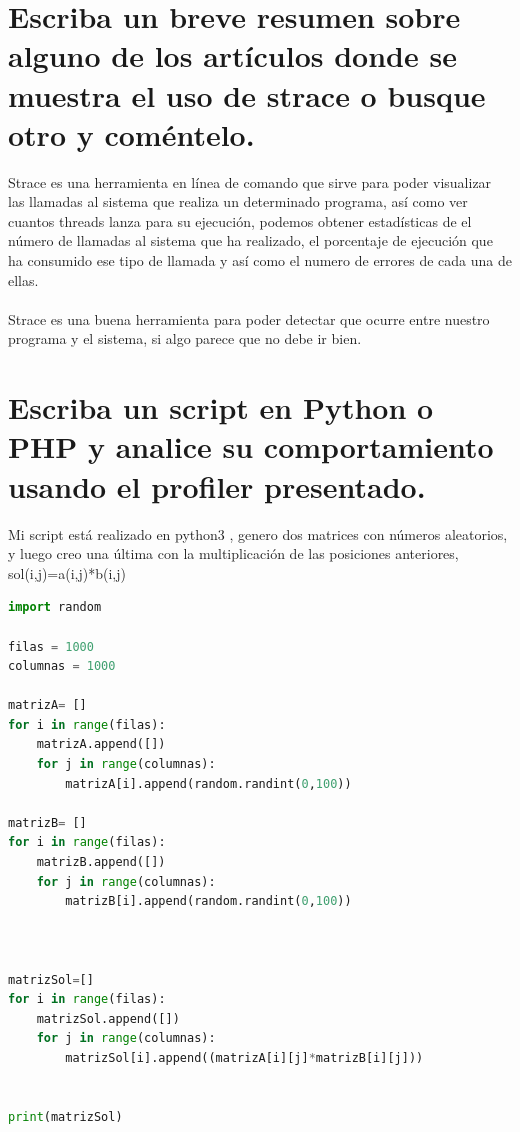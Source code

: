 \section[Cuestión 7]{ Escriba un breve resumen sobre alguno de los artículos donde se muestra el uso de strace o busque otro y coméntelo.}

Strace es una herramienta en línea de comando que sirve para poder visualizar las llamadas al sistema que realiza un determinado programa, así como ver cuantos threads lanza para su ejecución, podemos obtener estadísticas de el número de llamadas al sistema que ha realizado, el porcentaje de ejecución que ha consumido ese tipo de llamada y así como el numero de errores de cada una de ellas.\\
\\
Strace es una buena herramienta para poder detectar que ocurre entre nuestro programa y el sistema, si algo parece que no debe ir bien.

\section[Cuestión 8]{ Escriba un script en Python o PHP y analice su comportamiento usando el profiler presentado.}

Mi script está realizado en python3 \cite{python}, genero dos matrices con números aleatorios, y luego creo una última con la multiplicación de las posiciones anteriores, sol(i,j)=a(i,j)*b(i,j)

\begin{lstlisting}[language=python]
import random

filas = 1000
columnas = 1000

matrizA= []
for i in range(filas):
	matrizA.append([])
	for j in range(columnas):
		matrizA[i].append(random.randint(0,100))

matrizB= []
for i in range(filas):
	matrizB.append([])
	for j in range(columnas):
		matrizB[i].append(random.randint(0,100))



matrizSol=[]
for i in range(filas):
	matrizSol.append([])
	for j in range(columnas):
		matrizSol[i].append((matrizA[i][j]*matrizB[i][j]))


print(matrizSol)
\end{lstlisting}

